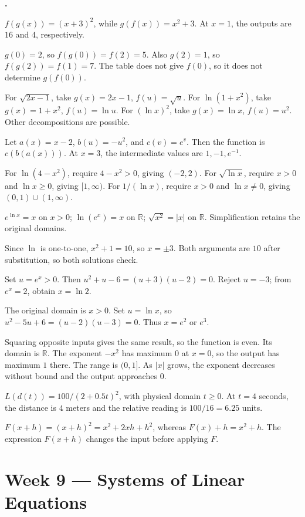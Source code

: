\documentclass[12pt]{book}
\newcommand{\R}{\mathbb R}
\newcounter{soln}[section]
\newenvironment{solutions}{%
  \setcounter{soln}{0}%
  \begin{list}{\textbf{\arabic{soln}.}}{%
    \usecounter{soln}\setlength{\leftmargin}{2.2em}\setlength{\itemsep}{10pt}}%
}{\end{list}}
\begin{document}
\begin{solutions}
\item $f(g(x))=(x+3)^2$, while $g(f(x))=x^2+3$. At $x=1$, the outputs are $16$ and $4$, respectively.
\item $g(0)=2$, so $f(g(0))=f(2)=5$. Also $g(2)=1$, so $f(g(2))=f(1)=7$. The table does not give $f(0)$, so it does not determine $g(f(0))$.
\item For $\sqrt{2x-1}$, take $g(x)=2x-1$, $f(u)=\sqrt u$. For $\ln(1+x^2)$, take $g(x)=1+x^2$, $f(u)=\ln u$. For $(\ln x)^2$, take $g(x)=\ln x$, $f(u)=u^2$. Other decompositions are possible.
\item Let $a(x)=x-2$, $b(u)=-u^2$, and $c(v)=e^v$. Then the function is $c(b(a(x)))$. At $x=3$, the intermediate values are $1,-1,e^{-1}$.
\item For $\ln(4-x^2)$, require $4-x^2>0$, giving $(-2,2)$. For $\sqrt{\ln x}$, require $x>0$ and $\ln x\geq0$, giving $[1,\infty)$. For $1/(\ln x)$, require $x>0$ and $\ln x\ne0$, giving $(0,1)\cup(1,\infty)$.
\item $e^{\ln x}=x$ on $x>0$; $\ln(e^x)=x$ on $\R$; $\sqrt{x^2}=|x|$ on $\R$. Simplification retains the original domains.
\item Since $\ln$ is one-to-one, $x^2+1=10$, so $x=\pm3$. Both arguments are $10$ after substitution, so both solutions check.
\item Set $u=e^x>0$. Then $u^2+u-6=(u+3)(u-2)=0$. Reject $u=-3$; from $e^x=2$, obtain $x=\ln2$.
\item The original domain is $x>0$. Set $u=\ln x$, so $u^2-5u+6=(u-2)(u-3)=0$. Thus $x=e^2$ or $e^3$.
\item Squaring opposite inputs gives the same result, so the function is even. Its domain is $\R$. The exponent $-x^2$ has maximum $0$ at $x=0$, so the output has maximum $1$ there. The range is $(0,1]$. As $|x|$ grows, the exponent decreases without bound and the output approaches $0$.
\item $L(d(t))=100/(2+0.5t)^2$, with physical domain $t\geq0$. At $t=4$ seconds, the distance is $4$ meters and the relative reading is $100/16=6.25$ units.
\item $F(x+h)=(x+h)^2=x^2+2xh+h^2$, whereas $F(x)+h=x^2+h$. The expression $F(x+h)$ changes the input before applying $F$.
\end{solutions}

\section*{Week 9 — Systems of Linear Equations}
\setcounter{section}{9}
\end{document}
